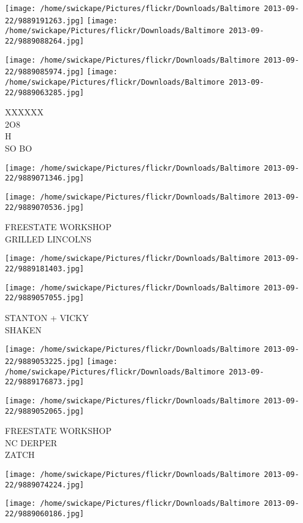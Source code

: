 \documentclass[10pt,letterpaper]{article}
\begin{document}
\texttt{[image: /home/swickape/Pictures/flickr/Downloads/Baltimore 2013-09-22/9889191263.jpg]}
\texttt{[image: /home/swickape/Pictures/flickr/Downloads/Baltimore 2013-09-22/9889088264.jpg]}

\texttt{[image: /home/swickape/Pictures/flickr/Downloads/Baltimore 2013-09-22/9889085974.jpg]}
\texttt{[image: /home/swickape/Pictures/flickr/Downloads/Baltimore 2013-09-22/9889063285.jpg]}

XXXXXX\\
2O8\\
H\\
SO BO
\pagebreak

\texttt{[image: /home/swickape/Pictures/flickr/Downloads/Baltimore 2013-09-22/9889071346.jpg]}

\vspace{0.25in}
\texttt{[image: /home/swickape/Pictures/flickr/Downloads/Baltimore 2013-09-22/9889070536.jpg]}

FREESTATE WORKSHOP\\
GRILLED LINCOLNS
\pagebreak

\texttt{[image: /home/swickape/Pictures/flickr/Downloads/Baltimore 2013-09-22/9889181403.jpg]}

\vspace{0.25in}
\texttt{[image: /home/swickape/Pictures/flickr/Downloads/Baltimore 2013-09-22/9889057055.jpg]}

STANTON + VICKY\\
SHAKEN
\pagebreak

\texttt{[image: /home/swickape/Pictures/flickr/Downloads/Baltimore 2013-09-22/9889053225.jpg]}
\texttt{[image: /home/swickape/Pictures/flickr/Downloads/Baltimore 2013-09-22/9889176873.jpg]}

\texttt{[image: /home/swickape/Pictures/flickr/Downloads/Baltimore 2013-09-22/9889052065.jpg]}

FREESTATE WORKSHOP\\
NC DERPER\\
ZATCH
\pagebreak

\texttt{[image: /home/swickape/Pictures/flickr/Downloads/Baltimore 2013-09-22/9889074224.jpg]}

\vspace{0.25in}
\texttt{[image: /home/swickape/Pictures/flickr/Downloads/Baltimore 2013-09-22/9889060186.jpg]}
\end{document}
